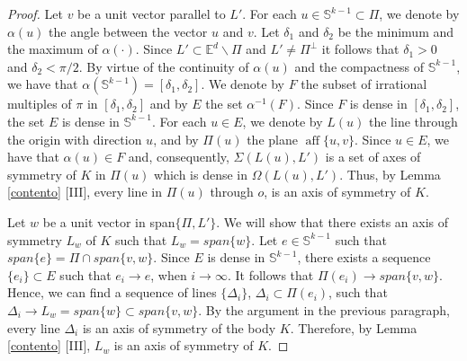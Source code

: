 \documentclass[10pt,a4paper]{amsart}
\newcommand{\Ed}{\mathbb{E}^{d}}
\newcommand{\aff}{\operatorname*{aff}}
\begin{document}
\begin{proof}
Let $v$ be a unit vector parallel to $L'$. For each $u\in \mathbb{S}^{k-1} \subset \Pi$, we denote by $\alpha(u)$ the angle between the vector $u$ and $v$. Let $\delta_1$ and $\delta_2$ be the minimum and the maximum of $\alpha (\cdot)$.  Since $L'\subset \Ed \backslash \Pi$ and $L'\not=\Pi^{\perp}$ it follows that $\delta_1>0$ and $\delta_2<\pi/2$. By virtue of the continuity of $\alpha(u)$ and the compactness of $\mathbb{S}^{k-1}$, we have that 
$\alpha (\mathbb{S}^{k-1})=[\delta_1,\delta_2]$. We denote by $F$ the subset of irrational multiples of $\pi$ in $[\delta_1,\delta_2]$ and by $E$ the set $\alpha^{-1}(F)$. Since $F$ is dense in $[\delta_1,\delta_2]$, the set $E$ is dense in $\mathbb{S}^{k-1}$. For each $u\in E$, we denote by $L(u)$ the line through the origin with direction $u$, and by $\Pi(u)$ the plane 
$\aff \{u,v\}$. Since $u\in E$, we have that $\alpha(u)\in F$ and, consequently, 
$\Sigma(L(u), L')$ is a set of axes of symmetry of $K$ in $\Pi(u)$ which is dense in 
$\Omega(L(u), L')$. Thus, by Lemma \ref{contento} [III], every line in $\Pi(u)$ through $o$, is an axis of symmetry of $K$. 


Let $w$ be a unit vector in span$\{\Pi,L'\}$. We will show that  there exists an axis of symmetry $L_w$ of $K$ such that $L_w=span\{w\}$. Let $e \in \mathbb{S}^{k-1}$ such that 
$span\{e\}=\Pi \cap span\{v,w\}$. Since $E$ is dense in $\mathbb{S}^{k-1}$, there exists a sequence $\{e_i\}\subset E$ such that $e_i \rightarrow e$, when $i \rightarrow \infty$. It follows that $\Pi(e_i) \rightarrow span\{v,w\}$. Hence, we can find a sequence of lines $\{\Delta_i\}$, $\Delta_i \subset \Pi(e_i)$, such that $\Delta_i \rightarrow L_w=span\{w\}\subset span\{v,w\}$. By the argument in the previous paragraph, every line $\Delta_i$ is an axis of symmetry of the body $K$. Therefore, by Lemma \ref{contento} [III], $L_w$ is an axis of symmetry of $K$.
\end{proof}
\end{document}
